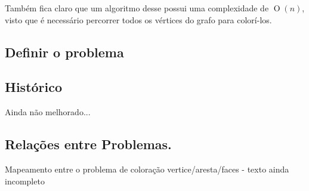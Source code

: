 \documentclass[12pt]{article}
\newcommand{\BigO}[1]{\ensuremath{\operatorname{O}\left(#1\right)}}
\begin{document}
Também fica claro que um algoritmo desse possui uma complexidade de $\BigO{n}$, visto que é necessário percorrer todos os vértices do grafo para colorí-los.


\subsection{Definir o problema}

\subsection{Histórico}

Ainda não melhorado...




\subsection{Relações entre Problemas.}

Mapeamento entre o problema de coloração vertice/aresta/faces - texto ainda incompleto

\end{document}
